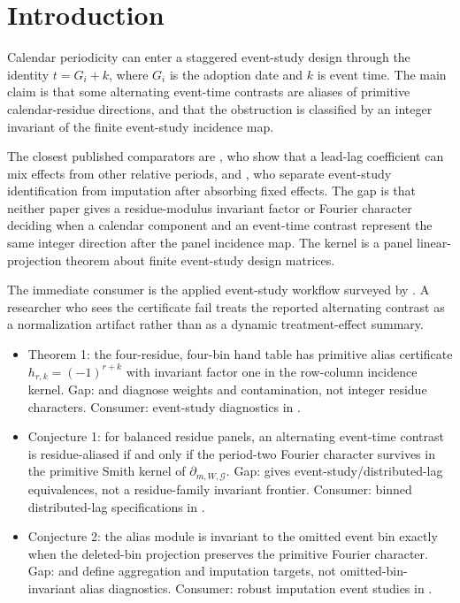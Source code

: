 \documentclass[11pt]{article}
\theoremstyle{definition}
\theoremstyle{plain}
\theoremstyle{remark}
\begin{document}
\section{Introduction}
Calendar periodicity can enter a staggered event-study design through the identity \(t=G_i+k\), where \(G_i\) is the adoption date and \(k\) is event time. The main claim is that some alternating event-time contrasts are aliases of primitive calendar-residue directions, and that the obstruction is classified by an integer invariant of the finite event-study incidence map.

The closest published comparators are \citet[p. 180, Sec. 3]{SunAbraham2021EventStudies}, who show that a lead-lag coefficient can mix effects from other relative periods, and \citet[p. 1791, Sec. 3]{BorusyakJaravelSpiess2024Revisiting}, who separate event-study identification from imputation after absorbing fixed effects. The gap is that neither paper gives a residue-modulus invariant factor or Fourier character deciding when a calendar component and an event-time contrast represent the same integer direction after the panel incidence map. The kernel is a panel linear-projection theorem about finite event-study design matrices.

The immediate consumer is the applied event-study workflow surveyed by \citet{RothSantAnnaBilinskiPoe2023WhatsTrending}. A researcher who sees the certificate fail treats the reported alternating contrast as a normalization artifact rather than as a dynamic treatment-effect summary.

\begin{itemize}[leftmargin=*]
\item Theorem 1: the four-residue, four-bin hand table has primitive alias certificate \(h_{r,k}=(-1)^{r+k}\) with invariant factor one in the row-column incidence kernel. Gap: \citet{GoodmanBacon2021Timing} and \citet{SunAbraham2021EventStudies} diagnose weights and contamination, not integer residue characters. Consumer: event-study diagnostics in \citet{RothSantAnnaBilinskiPoe2023WhatsTrending}.
\item Conjecture 1: for balanced residue panels, an alternating event-time contrast is residue-aliased if and only if the period-two Fourier character survives in the primitive Smith kernel of \(\partial_{m,W,\mathcal G}\). Gap: \citet{SchmidheinySiegloch2023EventStudies} gives event-study/distributed-lag equivalences, not a residue-family invariant frontier. Consumer: binned distributed-lag specifications in \citet{SchmidheinySiegloch2023EventStudies}.
\item Conjecture 2: the alias module is invariant to the omitted event bin exactly when the deleted-bin projection preserves the primitive Fourier character. Gap: \citet{CallawaySantAnna2021MultiplePeriods} and \citet{BorusyakJaravelSpiess2024Revisiting} define aggregation and imputation targets, not omitted-bin-invariant alias diagnostics. Consumer: robust imputation event studies in \citet{BorusyakJaravelSpiess2024Revisiting}.
\end{itemize}
\end{document}
